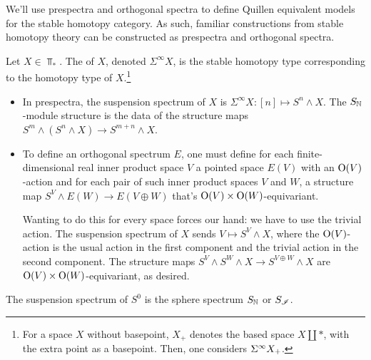 We'll use prespectra and orthogonal spectra to define Quillen equivalent models for the stable homotopy category.
As such, familiar constructions from stable homotopy theory can be constructed as prespectra and orthogonal
spectra.
\begin{exm}
Let $X\in\Top_*$. The  of $X$, denoted $\Sigma^\infty X$, is the stable homotopy type
corresponding to the homotopy type of $X$.\footnote{For a space $X$ without basepoint, $X_+$ denotes the based
space $X\amalg *$, with the extra point as a basepoint. Then, one considers $\Sigma^\infty X_+$.}
\begin{itemize}
	\item In prespectra, the suspension spectrum of $X$ is $\Sigma^\infty X\colon [n]\mapsto S^n\wedge X$. The
	$S_\mathbb N$-module structure is the data of the structure maps $S^m\wedge (S^n\wedge X)\to S^{m+n}\wedge X$.
	\item To define an orthogonal spectrum $E$, one must define for each finite-dimensional real inner product
	space $V$ a pointed space $E(V)$ with an $\mathrm O(V)$-action and for each pair of such inner product spaces $V$ and
	$W$, a structure map $S^V\wedge E(W)\to E(V\oplus W)$ that's $\mathrm O(V)\times\mathrm O(W)$-equivariant.

	Wanting to do this for every space forces our hand: we have to use the trivial action. The suspension spectrum
	of $X$ sends $V\mapsto S^V\wedge X$, where the $\mathrm O(V)$-action is the usual action in the first component and
	the trivial action in the second component. The structure maps $S^V\wedge S^W\wedge X\to S^{V\oplus W}\wedge X$
	are $\mathrm O(V)\times\mathrm O(W)$-equivariant, as desired.
\end{itemize}
The suspension spectrum of $S^0$ is the sphere spectrum $S_\mathbb N$ or $S_\mathscr I$.
\end{exm}
